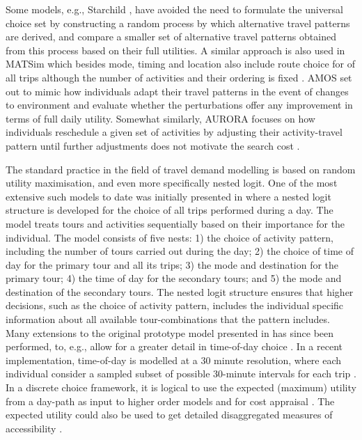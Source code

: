 Some models, e.g.,  Starchild \citep{recker86starchild1,recker86starchild2}, have avoided the need to formulate the universal choice set by constructing a random process by which alternative travel patterns are derived, and compare a smaller set of alternative travel patterns obtained from this process based on their full utilities.  
A similar approach is also used in MATSim which besides mode, timing and location also include route choice for of all trips although the number of activities and their ordering is fixed  \citep{lefebvre2007fast,grether2009mode,balmer05,horni2012high}.  AMOS \citep{kitamura1996Sams} set out to mimic how individuals adapt their travel patterns in the event of changes to environment and evaluate whether the perturbations offer any improvement in terms of full daily utility. Somewhat similarly, AURORA focuses on how individuals reschedule a given set of activities by adjusting their activity-travel pattern until further adjustments does not motivate the search cost \citep{timmermans2001modeling,joh2003Aurora, johEstimationAurora2005}.

The standard practice in the field of travel demand modelling is based on random utility maximisation, and even more specifically nested logit. One of the most extensive such models to date was initially presented in \citet{bowman2001} where a nested logit structure is developed for the choice of all trips performed during a day. The model treats tours and activities sequentially based on their importance for the individual. The model consists of five nests: 1) the choice of activity pattern, including the number of tours carried out during the day; 2) the choice of time of day for the primary tour and all its trips; 3) the mode and destination for the primary tour; 4) the time of day for the secondary tours; and 5) the mode and destination of the secondary tours. The nested logit structure ensures that higher decisions, such as the choice of activity pattern, includes the individual specific information about all available tour-combinations that the pattern includes. Many extensions to the original prototype model presented in \citet{bowman2001} has since been performed, to, e.g., allow for a greater detail in time-of-day choice \citep{Vovsha04}. In a recent implementation, time-of-day is modelled at a 30 minute resolution, where each individual consider a sampled subset of possible 30-minute intervals for each trip \citep{bradley2010sacsim}. In a discrete choice framework, it is logical to use the expected (maximum) utility from a day-path as input to higher order models and for cost appraisal \citep{Geurs10}. The expected utility could also be used to get detailed disaggregated measures of accessibility \citep{dong2006moving}.

